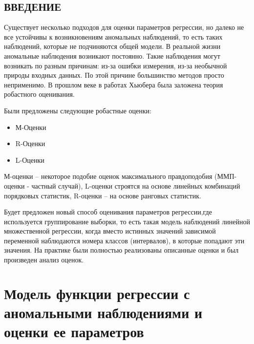 \documentclass[a4paper,14pt]{extarticle}
\begin{document}
\newpage
\thispagestyle{empty}
\addtocounter{page}{-1}
\mbox{}
\newpage

\tableofcontents
\newpage
\begin{center}
    \section*{ВВЕДЕНИЕ}
\end{center}
{}
Существует несколько подходов для оценки параметров регрессии, но далеко не все устойчивы к возникновениям аномальных наблюдений, 
то есть таких наблюдений, которые не подчиняются общей модели. 
В реальной жизни аномальные наблюдения возникают постоянно. 
Такие наблюдения могут возникать по разным причинам: из-за ошибки измерения, из-за необычной природы входных данных.
По этой причине большинство методов просто неприменимо.
В прошлом веке в работах Хьюбера была заложена теория робастного оценивания.

Были предложены следующие робастные оценки\cite{Huber}:
\begin{itemize}
    \item М-Оценки
    \item R-Оценки
    \item L-Оценки
\end{itemize}
М-оценки -- некоторое подобие оценок максимального правдоподобия (ММП-оценки - частный случай), L-оценки строятся на основе линейных комбинаций порядковых статистик, R-оценки -- на основе ранговых статистик.

Будет предложен новый способ оценивания параметров регрессии,где используется группирование выборки, 
то есть такая модель наблюдений линейной  множественной  регрессии,  когда  вместо  истинных  значений
зависимой переменной наблюдаются номера классов (интервалов), в которые
попадают эти значения\cite{OLSforGrouping}. На практике были полностью реализованы описанные оценки и был произведен анализ оценок. 


\newpage
\section{Модель функции регрессии с аномальными наблюдениями и оценки ее параметров} \label{sec_1}
\end{document}
